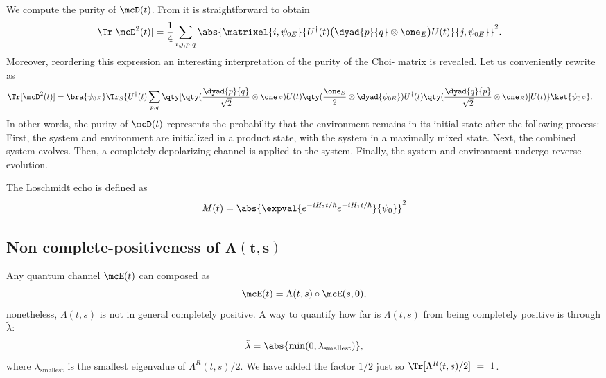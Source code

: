 We compute the purity of $\mcD(t)$. From  
it is straightforward to obtain
\begin{align}\label{eq:choi:chaometer:purity:1}
\Tr[\mcD^2(t)]  &= 
\frac{1}{4}
\sum_{i,j,p,q}
\abs{\matrixel{i, \psi_{0E}}
{U^\dagger(t) \big(\dyad{p}{q} \otimes \one_E\big) U(t)}
{j, \psi_{0E}}
}^2.
\end{align}
Moreover, reordering this expression an interesting interpretation of the purity 
of the Choi-\jami{} matrix is revealed. Let us conveniently rewrite
 as
\begin{align}\label{eq:choi:chaometer:purity:2}
\Tr[\mcD^2(t)]  &= 
\bra{\psi_{0E}}
\Tr_S\{
U^\dagger(t) 
\sum_{p, q} \qty[
\qty(\frac{\dyad{p}{q}}{\sqrt{2}} \otimes \one_E ) 
U(t)
\qty( \frac{\one_S}{2} \otimes \dyad{\psi_{0E}})
U^\dagger(t) 
\qty(\frac{\dyad{q}{p}}{\sqrt{2}} \otimes \one_E ) 
]
U(t)\}
\ket{\psi_{0E}}.
\end{align}
In other words, the purity of $\mcD(t)$ represents the probability that the 
environment remains in its initial state after the following process: First, the system
and environment are initialized in a product state, with the system in a maximally
mixed state. Next, the combined system evolves. Then, a completely depolarizing
channel is applied to the system. Finally, the system and environment undergo 
reverse evolution.

The Loschmidt echo is defined as
\begin{equation}\label{eq:loschmidt:echo}
M(t) = 
\abs{\expval{e^{-i H_2 t/\hbar}e^{-i H_1 t/\hbar}}{\psi_0}}^2
\end{equation}

\subsection{Non complete-positiveness of $\boldsymbol{\Lambda(t, s)}$}
Any quantum channel $\mcE(t)$ can composed as 
\begin{equation}\label{eq:Lambda}
\mcE(t) = 
\Lambda(t,s) \circ \mcE(s, 0),
\end{equation}
nonetheless, $\Lambda(t,s)$ is not in general completely positive. A way to 
quantify how far is $\Lambda(t,s)$ from being completely positive is through 
$\tilde \lambda$:
\begin{equation}\label{eq:lambda:tilde}
\tilde \lambda = 
\abs{\min(0, \lambda_{\text{smallest}})},
\end{equation}
where $\lambda_{\text{smallest}}$ is the smallest eigenvalue of 
$\Lambda^R(t,s)/2$. We have added the factor $1/2$ just so 
$\Tr[\Lambda^R(t,s)/2]~=~1$.

